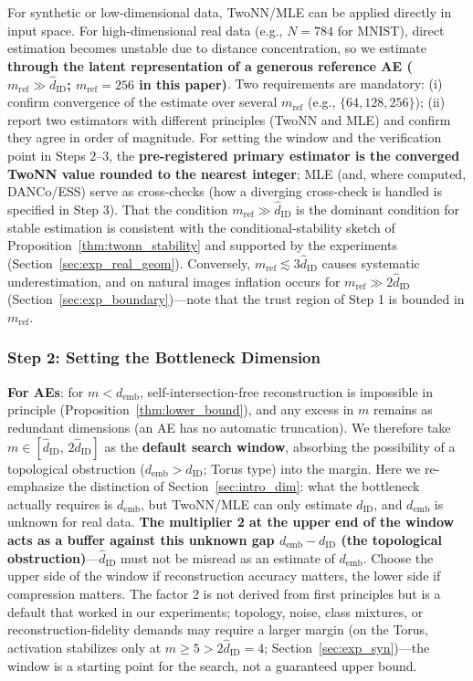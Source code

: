 \documentclass[make,article,submit,pdftex,moreauthors]{Definitions/mdpi}
\newcommand{\dID}{d_{\mathrm{ID}}}
\newcommand{\hatdID}{\hat{d}_{\mathrm{ID}}}
\newcommand{\demb}{d_{\mathrm{emb}}}
\begin{document}
For synthetic or low-dimensional data, TwoNN/MLE can be applied directly in
input space.
For high-dimensional real data (e.g., $N = 784$ for MNIST), direct
estimation becomes unstable due to distance concentration, so we estimate
\textbf{through the latent representation of a generous reference AE
($m_{\mathrm{ref}} \gg \hatdID$; $m_{\mathrm{ref}} = 256$ in this paper)}.
Two requirements are mandatory:
(i) confirm convergence of the estimate over several $m_{\mathrm{ref}}$
(e.g., $\{64, 128, 256\}$);
(ii) report two estimators with different principles (TwoNN and MLE) and
confirm they agree in order of magnitude.
For setting the window and the verification point in Steps 2--3, the
\textbf{pre-registered primary estimator is the converged TwoNN value
rounded to the nearest integer}; MLE (and, where computed, DANCo/ESS)
serve as cross-checks (how a diverging cross-check is handled is specified
in Step 3).
That the condition $m_{\mathrm{ref}} \gg \hatdID$ is the dominant condition
for stable estimation is consistent with the conditional-stability sketch
of Proposition~\ref{thm:twonn_stability} and supported by the experiments
(Section~\ref{sec:exp_real_geom}).
Conversely, $m_{\mathrm{ref}} \lesssim 3\hatdID$ causes systematic
underestimation, and on natural images inflation occurs for
$m_{\mathrm{ref}} \gg 2\hatdID$ (Section~\ref{sec:exp_boundary})---note that
the trust region of Step 1 is bounded in $m_{\mathrm{ref}}$.

\subsubsection{Step 2: Setting the Bottleneck Dimension}\label{sec:protocol_s2}

\textbf{For AEs}: for $m < \demb$, self-intersection-free reconstruction is
impossible in principle (Proposition~\ref{thm:lower_bound}), and any excess
in $m$ remains as redundant dimensions (an AE has no automatic truncation).
We therefore take $m \in [\hatdID,\, 2\hatdID]$ as the \textbf{default
search window}, absorbing the possibility of a topological obstruction
($\demb > \dID$; Torus type) into the margin.
Here we re-emphasize the distinction of
Section~\ref{sec:intro_dim}: what the bottleneck actually requires is
$\demb$, but TwoNN/MLE can only estimate $\dID$, and $\demb$ is unknown for
real data.
\textbf{The multiplier 2 at the upper end of the window acts as a buffer
against this unknown gap $\demb - \dID$ (the topological
obstruction)}---$\hatdID$ must not be misread as an estimate of $\demb$.
Choose the upper side of the window if reconstruction accuracy matters, the
lower side if compression matters.
The factor 2 is not derived from first principles but is a default that
worked in our experiments; topology, noise, class mixtures, or
reconstruction-fidelity demands may require a larger margin (on the Torus,
activation stabilizes only at $m \geq 5 > 2\hatdID = 4$;
Section~\ref{sec:exp_syn})---the window is a starting point for the search,
not a guaranteed upper bound.
\end{document}
